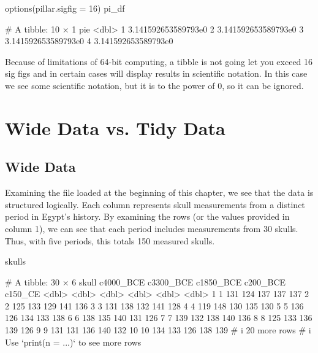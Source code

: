 \begin{inR}
options(pillar.sigfig = 16)
pi_df
\end{inR}
\begin{outR}
# A tibble: 10 × 1
                   pie
                 <dbl>
 1 3.141592653589793e0
 2 3.141592653589793e0
 3 3.141592653589793e0
 4 3.141592653589793e0
\end{outR}

Because of limitations of 64-bit computing, a tibble is not going let you exceed 16 sig figs and in certain cases will display results in scientific notation. In this case we see some scientific notation, but it is to the power of 0, so it can be ignored.

\section{Wide Data vs. Tidy Data}

\subsection{Wide Data}
\label{sec:wide_data}

Examining the  file loaded at the beginning of this chapter, we see that the data is structured logically. Each column represents skull measurements from a distinct period in Egypt’s history. By examining the rows (or the values provided in column 1), we can see that each period includes measurements from 30 skulls. Thus, with five periods, this totals 150 measured skulls.

\begin{inR}
skulls
\end{inR}

\begin{outR}
# A tibble: 30 × 6
   skull c4000_BCE c3300_BCE c1850_BCE c200_BCE c150_CE
   <dbl>     <dbl>     <dbl>     <dbl>    <dbl>   <dbl>
 1     1       131       124       137      137     137
 2     2       125       133       129      141     136
 3     3       131       138       132      141     128
 4     4       119       148       130      135     130
 5     5       136       126       134      133     138
 6     6       138       135       140      131     126
 7     7       139       132       138      140     136
 8     8       125       133       136      139     126
 9     9       131       131       136      140     132
10    10       134       133       126      138     139
# i 20 more rows
# i Use `print(n = ...)` to see more rows
\end{outR}

